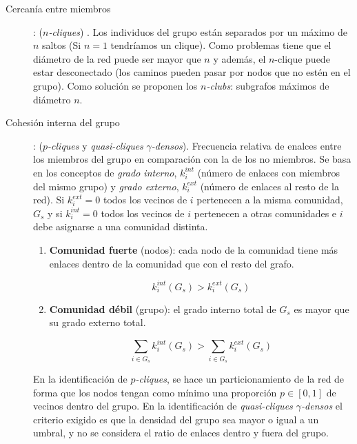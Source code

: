 \documentclass[10pt,spanish, landscape, twocolumn]{article}
\begin{document}
\begin{description}
    \item[Cercanía entre miembros]: (\textit{\textcolor{temaseis}{$n$-cliques}}) . Los individuos del grupo están separados por un máximo de $n$ saltos (Si $n=1$ tendríamos un clique). Como problemas tiene que el diámetro de la red puede ser mayor que $n$ y además, el $n$-clique puede estar desconectado (los caminos pueden pasar por nodos que no estén en el grupo). Como solución se proponen los \textit{\textcolor{temaseis}{$n$-clubs}}: subgrafos máximos de diámetro $n$.
    \item[Cohesión interna del grupo]: (\textit{\textcolor{temaseis}{$p$-cliques}} y \textit{\textcolor{temaseis}{quasi-cliques}} \textit{\textcolor{temaseis}{$\gamma$-densos}}). Frecuencia relativa de enalces entre los miembros del grupo en comparación con la de los no miembros. Se basa en los conceptos de \textit{\textcolor{temaseis}{grado interno}}, $k_i^{int}$ (número de enlaces con miembros del mismo grupo) y \textit{\textcolor{temaseis}{grado externo}}, $k_i^{ext}$ (número de enlaces al resto de la red). Si $k_i^{ext} = 0$ todos los vecinos de $i$ pertenecen a la misma comunidad, $G_s$ y si $k_i^{int} = 0$ todos los vecinos de $i$ pertenecen a otras comunidades e $i$ debe asignarse a una comunidad distinta.

    \begin{enumerate}[\color{temaseis}{$\heartsuit$}]
        \item \textbf{\textcolor{temaseis}{Comunidad fuerte}} (nodos): cada nodo de la comunidad tiene más enlaces dentro de la comunidad que con el resto del grafo.

        \begin{displaymath}
            k_i^{int} (G_s) > k_i^{ext} (G_s)
        \end{displaymath}

        \item \textbf{\textcolor{temaseis}{Comunidad débil}} (grupo): el grado interno total de $G_s$ es mayor que su grado externo total.

        \begin{displaymath}
            \sum_{i \in G_s} k_i^{int} (G_s) > \sum_{i \in G_s} k_i^{ext} (G_s)
        \end{displaymath}
    \end{enumerate}

    En la identificación de \textit{\textcolor{temaseis}{$p$-cliques}}, se hace un particionamiento de la red de forma que los nodos tengan como mínimo una proporción $p \in [0,1]$ de vecinos dentro del grupo. En la identificación de \textit{\textcolor{temaseis}{quasi-cliques $\gamma$-densos}} el criterio exigido es que la densidad del grupo sea mayor o igual a un umbral, y no se considera el ratio de enlaces dentro y fuera del grupo.
\end{description}
\end{document}
